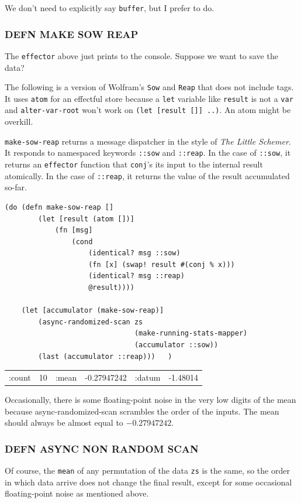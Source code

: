 \documentclass[10pt,oneside,x11names]{article}
\begin{document}
We don't need to explicitly say \texttt{buffer}, but I prefer to do.

\subsubsection{DEFN MAKE SOW REAP}
\label{sow-and-reap}
The \texttt{effector} above just prints to the console. Suppose we want to save
the data?

The following is a version of Wolfram's \texttt{Sow} and \texttt{Reap} that does not
include tags. It uses \texttt{atom} for an effectful store because a \texttt{let}
variable like \texttt{result} is not a \texttt{var} and \texttt{alter-var-root} won't work on
\texttt{(let [result []] ..)}. An atom might be overkill.

\texttt{make-sow-reap} returns a message dispatcher in the style of \emph{The Little
Schemer}. It responds to namespaced keywords \texttt{::sow} and \texttt{::reap}. In
the case of \texttt{::sow}, it returns an \texttt{effector} function that \texttt{conj}'s its
input to the internal result atomically. In the case of \texttt{::reap}, it
returns the value of the result accumulated so-far.

\begin{verbatim}
(do (defn make-sow-reap []
        (let [result (atom [])]
            (fn [msg]
                (cond
                    (identical? msg ::sow)
                    (fn [x] (swap! result #(conj % x)))
                    (identical? msg ::reap)
                    @result))))

    (let [accumulator (make-sow-reap)]
        (async-randomized-scan zs
                               (make-running-stats-mapper)
                               (accumulator ::sow))
        (last (accumulator ::reap)))   )
\end{verbatim}

\begin{center}
\begin{tabular}{lrlrlr}
:count & 10 & :mean & -0.27947242 & :datum & -1.48014\\
\end{tabular}
\end{center}

Occasionally, there is some floating-point noise in the very low digits
of the mean because async-randomized-scan scrambles the order of the
inputs. The mean should always be almost equal to \(-0.27947242\).

\subsubsection{DEFN ASYNC NON RANDOM SCAN}
\label{not-randomized}
Of course, the \texttt{mean} of any permutation of the data \texttt{zs} is the same,
so the order in which data arrive does not change the final result,
except for some occasional floating-point noise as mentioned above.
\end{document}
